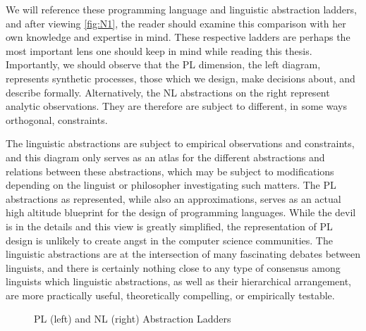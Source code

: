 We will reference these programming language and linguistic abstraction ladders,
and after viewing \autoref{fig:N1}, the reader should examine this
comparison with her own knowledge and expertise in mind. These respective
ladders are perhaps the most important lens one should keep in mind while
reading this thesis. Importantly, we should observe that the PL dimension, the
left diagram, represents synthetic processes, those which we design, make
decisions about, and describe formally. Alternatively, the NL abstractions on
the right represent analytic observations. They are therefore are subject to
different, in some ways orthogonal, constraints.

The linguistic abstractions are subject to empirical observations and
constraints, and this diagram only serves as an atlas for the different
abstractions and relations between these abstractions, which may be subject to
modifications depending on the linguist or philosopher investigating such
matters. The PL abstractions as represented, while also an approximations,
serves as an actual high altitude blueprint for the design of programming
languages. While the devil is in the details and this view is greatly
simplified, the representation of PL design is unlikely to create angst in the
computer science communities. The linguistic abstractions are at the
intersection of many fascinating debates between linguists, and there is
certainly nothing close to any type of consensus among linguists which
linguistic abstractions, as well as their hierarchical arrangement, are more
practically useful, theoretically compelling, or empirically testable.


\begin{figure}
\centering
{}
\hspace{1cm}
\caption{PL (left) and NL (right) Abstraction Ladders} \label{fig:N1}
\end{figure}


